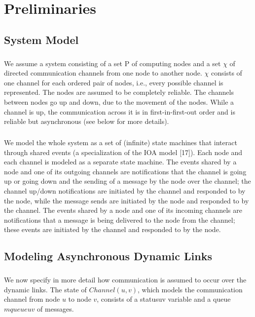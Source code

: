 \chapter{Preliminaries}
\section{System Model}
\paragraph{}We assume a system consisting of a set P of computing nodes and a set $\chi$ of directed communication channels from one node to another node. $\chi$ consists of one channel for each ordered pair of nodes, i.e., every possible channel is represented. The nodes are assumed to be completely reliable. The channels between nodes go up and down, due to the movement of the nodes. While a channel is up, the communication across it is in first-in-first-out order and is reliable but asynchronous (see below for more details).
\paragraph{}We model the whole system as a set of (infinite) state machines that interact through shared events (a specialization of the IOA model [17]). Each node and each channel is modeled as a separate state machine. The events shared by a node and one of its outgoing channels are notifications that the channel is going up or going down and the sending of a message by the node over the channel; the channel up/down notifications are initiated by the channel and responded to by the node, while the message sends are initiated by the node and responded to by the channel. The events shared by a node and one of its incoming channels are notifications that a message is being delivered to the node from the channel; these events are initiated by the channel and responded to by the node.
\section{Modeling Asynchronous Dynamic Links}
\paragraph{}We now specify in more detail how communication is assumed to occur over the dynamic links. The state of $Channel(u, v)$, which models the communication channel from node $u$ to node $v$, consists of a statusuv variable and a queue $mqueueuv$ of messages.
